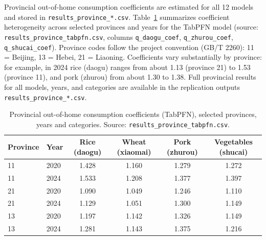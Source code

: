 Provincial out-of-home consumption coefficients are estimated for all 12 models and stored in \texttt{results\_province\_*.csv}. Table~\ref{tab:provincial_heterogeneity} summarizes coefficient heterogeneity across selected provinces and years for the TabPFN model (source: \texttt{results\_province\_tabpfn.csv}, columns \texttt{q\_daogu\_coef}, \texttt{q\_zhurou\_coef}, \texttt{q\_shucai\_coef}). Province codes follow the project convention (GB/T 2260): 11 = Beijing, 13 = Hebei, 21 = Liaoning. Coefficients vary substantially by province: for example, in 2024 rice (daogu) ranges from about 1.13 (province 21) to 1.53 (province 11), and pork (zhurou) from about 1.30 to 1.38. Full provincial results for all models, years, and categories are available in the replication outputs \texttt{results\_province\_*.csv}.

\begin{table}[htbp]
\centering
\caption{Provincial out-of-home consumption coefficients (TabPFN), selected provinces, years and categories. Source: \texttt{results\_province\_tabpfn.csv}.}
\label{tab:provincial_heterogeneity}
\begin{tabular}{llcccc}
\toprule
Province & Year & Rice (daogu) & Wheat (xiaomai) & Pork (zhurou) & Vegetables (shucai) \\
\midrule
11 & 2020 & 1.428 & 1.160 & 1.279 & 1.272 \\
11 & 2024 & 1.533 & 1.208 & 1.377 & 1.397 \\
21 & 2020 & 1.090 & 1.049 & 1.246 & 1.110 \\
21 & 2024 & 1.129 & 1.051 & 1.300 & 1.149 \\
13 & 2020 & 1.197 & 1.142 & 1.326 & 1.149 \\
13 & 2024 & 1.281 & 1.143 & 1.375 & 1.216 \\
\bottomrule
\end{tabular}
\end{table}

